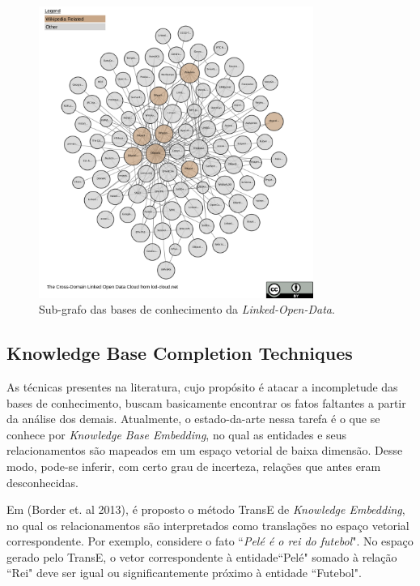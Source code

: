 \documentclass[]{politex}
\begin{document}
\begin{figure}[h]
    \centering
    \includegraphics[width=0.8\textwidth]{images/cross-domain-lod.png}
    \caption{Sub-grafo das bases de conhecimento da \textit{Linked-Open-Data}.}
    \label{fig:lod_cloud}
\end{figure}

\subsection{Knowledge Base Completion Techniques}

As técnicas presentes na literatura, cujo propósito é atacar a incompletude das bases de conhecimento, buscam basicamente encontrar os fatos faltantes a partir da análise dos demais. Atualmente, o estado-da-arte nessa tarefa é o que se conhece por \textit{Knowledge Base Embedding}, no qual as entidades e seus relacionamentos são mapeados em um espaço vetorial de baixa dimensão. Desse modo, pode-se inferir, com certo grau de incerteza, relações que antes eram desconhecidas. 

Em (Border et. al 2013)\cite{NIPS2013_5071}, é proposto o método TransE de \textit{Knowledge Embedding}, no qual os relacionamentos são interpretados como translações no espaço vetorial correspondente. Por exemplo, considere o fato ``\textit{Pelé é o rei do futebol}". No espaço gerado pelo TransE, o vetor correspondente à entidade``Pelé" somado à relação ``Rei" deve ser igual ou significantemente próximo à entidade ``Futebol". 
\end{document}
